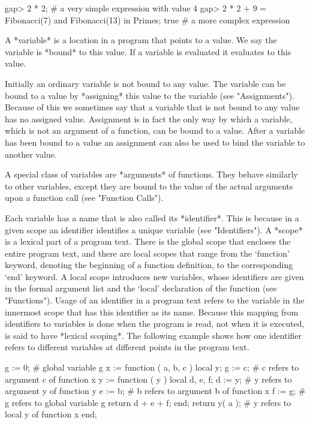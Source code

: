 \beginexample
gap> 2 * 2;  # a very simple expression with value
4
gap> 2 * 2 + 9 = Fibonacci(7) and Fibonacci(13) in Primes;
true      # a more complex expression
\endexample


A *variable* is a location in a {\GAP} program that points to a value.
We say the variable is *bound* to this value. If a variable is evaluated
it evaluates to this value.

Initially an ordinary variable is not bound to any value. The variable
can be bound to a value by *assigning* this value to the variable (see
"Assignments"). Because of this we sometimes say that a variable that is
not bound to any value has no assigned value. Assignment is in fact the
only way by which a variable, which is not an argument of a function, can
be bound to a value. After a variable has been bound to a  value an
assignment can also be used to bind the variable to another value.

A special class of variables are *arguments* of functions. They behave
similarly to other variables, except they are bound to the value of the
actual arguments upon a function call (see "Function Calls").

Each variable has a name that is also called its *identifier*. This is
because in a given scope an identifier identifies a unique variable (see
"Identifiers"). A *scope* is a lexical part of a program text. There is
the global scope that encloses the entire program text, and there are
local scopes that range from the `function' keyword, denoting the
beginning of a function definition, to the corresponding `end' keyword.
A local scope introduces new variables, whose identifiers are given in
the formal argument list and the `local' declaration of the function (see
"Functions"). Usage of an identifier in a program text refers to the
variable in the innermost scope that has this identifier as its name.
Because this mapping from identifiers to variables is done when the
program is read, not when it is executed, {\GAP} is said to have *lexical
scoping*.  The following example shows how one identifier refers to
different variables at different points in the program text.

\begintt
 g := 0;      # global variable g
 x := function ( a, b, c )
  local  y;
  g := c;     # c refers to argument c of function x
  y := function ( y )
    local d, e, f;
    d := y;   # y refers to argument y of function y
    e := b;   # b refers to argument b of function x
    f := g;   # g refers to global variable g
    return d + e + f;
  end;
  return y( a ); # y refers to local y of function x
end;
\endtt

